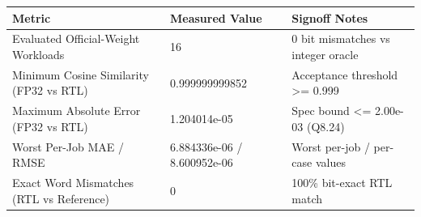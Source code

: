 \documentclass[11pt,a4paper]{article}
\begin{document}
{\small\renewcommand{\arraystretch}{1.18}\begin{longtable}{@{}L{0.38\textwidth}|L{0.26\textwidth}|L{0.28\textwidth}@{}}\toprule

\textbf{Metric} & \textbf{Measured Value} & \textbf{Signoff Notes}\\\midrule\endhead

Evaluated Official-Weight Workloads & 16 & 0 bit mismatches vs integer oracle\\[2pt]\hline

Minimum Cosine Similarity (\allowbreak{}FP32 vs RTL)\allowbreak{} & 0.99999999\allowbreak{}9852 & Acceptance threshold >=\allowbreak{} 0.999\\[2pt]\hline

Maximum Absolute Error (\allowbreak{}FP32 vs RTL)\allowbreak{} & 1.204014e-05 & Spec bound <=\allowbreak{} 2.00e-03 (\allowbreak{}Q8.24)\allowbreak{}\\[2pt]\hline

Worst Per-Job MAE /\allowbreak{} RMSE & 6.884336e-06 /\allowbreak{} 8.600952e-06 & Worst per-job /\allowbreak{} per-case values\\[2pt]\hline

Exact Word Mismatches (\allowbreak{}RTL vs Reference)\allowbreak{} & 0 & 100\% bit-exact RTL match\\[2pt]\hline

\bottomrule\end{longtable}}
\end{document}
